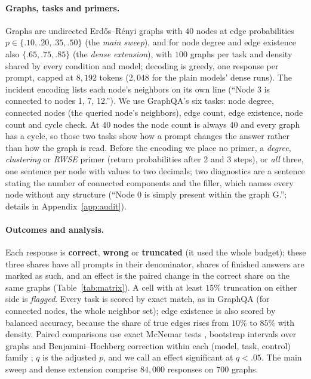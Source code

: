 \documentclass[11pt]{article}
\begin{document}
\paragraph{Graphs, tasks and primers.} Graphs are undirected Erd\H{o}s--R\'enyi graphs \citep{gilbert1959random} with $40$ nodes at edge probabilities $p\in\{.10,.20,.35,.50\}$ (the \emph{main sweep}), and for node degree and edge existence also $\{.65,.75,.85\}$ (the \emph{dense extension}), with $100$ graphs per task and density shared by every condition and model; decoding is greedy, one response per prompt, capped at $8{,}192$ tokens ($2{,}048$ for the plain models' dense runs). %
The incident encoding lists each node's neighbors on its own line (``Node 3 is connected to nodes 1, 7, 12.''). We use GraphQA's six tasks: node degree, connected nodes (the queried node's neighbors), edge count, edge existence, node count and cycle check. At $40$ nodes the node count is always $40$ and every graph has a cycle, %
so those two tasks show how a prompt changes the answer rather than how the graph is read. Before the encoding we place no primer, a \emph{degree}, \emph{clustering} or \emph{RWSE} primer (return probabilities after 2 and 3 steps), or \emph{all} three, one sentence per node with values to two decimals; two diagnostics are a sentence stating the number of connected components and the filler, which names every node without any structure (``Node 0 is simply present within the graph G.''; details in Appendix~\ref{app:audit}).

\paragraph{Outcomes and analysis.} Each response is \textbf{correct}, \textbf{wrong} or \textbf{truncated} (it used the whole budget); these three shares have all prompts in their denominator, shares of finished answers are marked as such, and an effect is the paired change in the correct share on the same graphs (Table~\ref{tab:matrix}). A cell with at least $15\%$ truncation on either side is \emph{flagged}. Every task is scored by exact match, as in GraphQA (for connected nodes, the whole neighbor set); edge existence is also scored by balanced accuracy, because the share of true edges rises from $10\%$ to $85\%$ with density. %
Paired comparisons use exact McNemar tests \citep{mcnemar1947note}, bootstrap intervals over graphs and Benjamini--Hochberg correction within each (model, task, control) family \citep{benjaminihochberg1995controlling}; $q$ is the adjusted $p$, and we call an effect significant at $q<.05$. The main sweep and dense extension comprise $84{,}000$ responses on $700$ graphs. %
\end{document}
